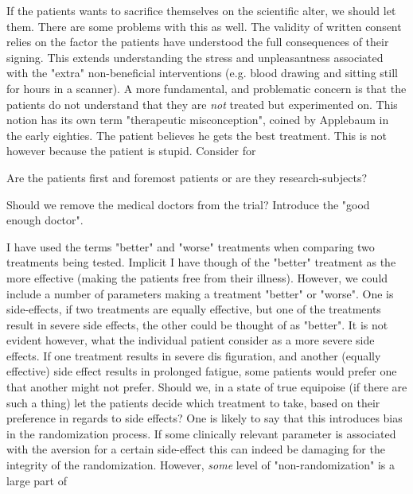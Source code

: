 \documentclass[12p]{article}
\begin{document}
If the patients wants to sacrifice themselves on the scientific alter, we should let them.
There are some problems with this as well.
The validity of written consent relies on the factor the patients have understood the full consequences of their signing.
This extends understanding the stress and unpleasantness associated with the "extra" non-beneficial interventions (e.g. blood drawing and sitting still for hours in a scanner).
A more fundamental, and problematic concern is that the patients do not understand that they are \emph{not} treated but experimented on.
This notion has its own term "therapeutic misconception", coined by Applebaum in the early eighties.
The patient believes he gets the best treatment.
This is not however because the patient is stupid.
Consider for




Are the patients first and foremost patients or are they research-subjects?

Should we remove the medical doctors from the trial? Introduce the "good enough doctor".

I have used the terms "better" and "worse" treatments when comparing two treatments being tested.
Implicit I have though of the "better" treatment as the more effective (making the patients free from their illness).
However, we could include a number of parameters making a treatment "better" or "worse".
One is side-effects, if two treatments are equally effective, but one of the treatments result in severe side effects, the other could be thought of as "better".
It is not evident however, what the individual patient consider as a more severe side effects.
If one treatment results in severe dis figuration, and another (equally effective) side effect results in prolonged fatigue, some patients would prefer one that another might not prefer.
Should we, in a state of true equipoise (if there are such a thing) let the patients decide which treatment to take, based on their preference in regards to side effects?
One is likely to say that this introduces bias in the randomization process.
If some clinically relevant parameter is associated with the aversion for a certain side-effect this can indeed be damaging for the integrity of the randomization.
However, \emph{some} level of "non-randomization" is a large part of 
\end{document}
